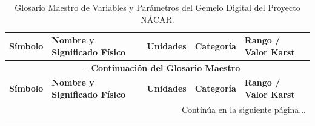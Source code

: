\documentclass[11pt,letterpaper]{article}
\begin{document}
{\small
\begin{longtable}{p{1.85cm} p{5.95cm} p{2.15cm} p{2.15cm} p{2.55cm}}
\caption{Glosario Maestro de Variables y Parámetros del Gemelo Digital del Proyecto NÁCAR.} \label{tab:glosario} \\
\hline
\textbf{Símbolo} & \textbf{Nombre y Significado Físico} & \textbf{Unidades} & \textbf{Categoría} & \textbf{Rango / Valor Karst} \\
\hline
\endfirsthead
\multicolumn{5}{c}{{\bfseries \tablename\ \thetable{} -- Continuación del Glosario Maestro}} \\
\hline
\textbf{Símbolo} & \textbf{Nombre y Significado Físico} & \textbf{Unidades} & \textbf{Categoría} & \textbf{Rango / Valor Karst} \\
\hline
\endhead
\hline \multicolumn{5}{r}{{Continúa en la siguiente página...}} \\ \hline
\endfoot
\hline
\endlastfoot


\end{longtable}}
\end{document}
